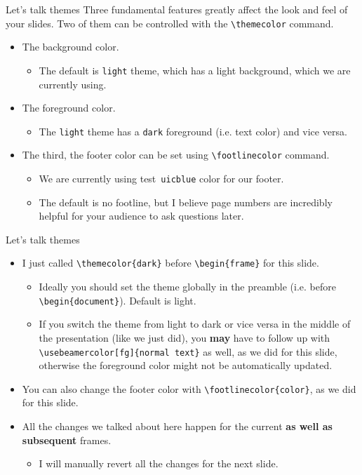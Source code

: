 \documentclass{beamer}
\newcommand{\testcolor}[1]{\colorbox{#1}{\textcolor{#1}{test}}~\texttt{#1}}
\begin{document}
\begin{frame}[fragile]{Let's talk themes}
Three fundamental features greatly affect the look and feel of your slides. Two of them can be controlled with the \verb|\themecolor| command.
\begin{itemize}
\item The background color.
\begin{itemize}
    \item The default is \verb|light| theme, which has a light background, which we are currently using.
\end{itemize}
\item The foreground color.
\begin{itemize}
    \item The \verb|light| theme has a \verb|dark| foreground (i.e. text color) and vice versa.
\end{itemize}
\item The third, the footer color can be set using \verb|\footlinecolor| command.
\begin{itemize}
    \item We are currently using \testcolor{uicblue} color for our footer.
    \item The default is no footline, but I believe page numbers are incredibly helpful for your audience to ask questions later.
\end{itemize}
\end{itemize}
\end{frame}


\begin{frame}[fragile]{Let's talk themes}
\begin{itemize}
\item I just called \verb|\themecolor{dark}| before \verb|\begin{frame}| for this slide.
\begin{itemize}
    \item Ideally you should set the theme globally in the preamble (i.e. before \verb|\begin{document}|). Default is light.
    \item If you switch the theme from light to dark or vice versa in the middle of the presentation (like we just did), you \textbf{may} have to follow up with \verb|\usebeamercolor[fg]{normal text}| as well, as we did for this slide, otherwise the foreground color might not be automatically updated.
\end{itemize}
\item You can also change the footer color with \verb|\footlinecolor{color}|, as we did for this slide.
\item All the changes we talked about here happen for the current \textbf{as well as subsequent} frames.
\begin{itemize}
    \item I will manually revert all the changes for the next slide.
\end{itemize}
\end{itemize}
\end{frame}
\end{document}
